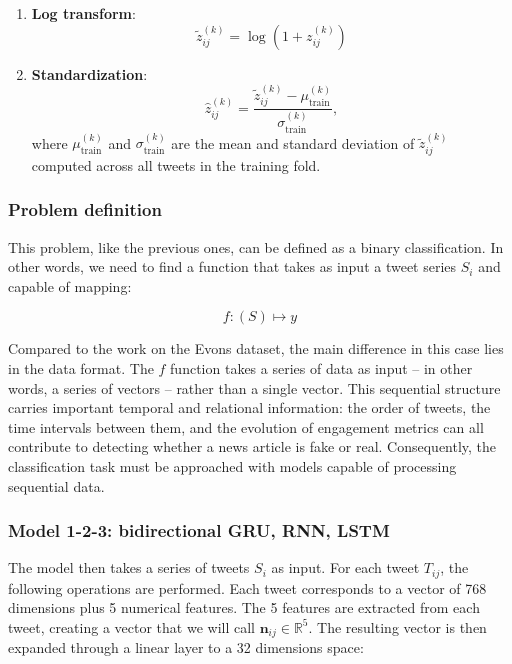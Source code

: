 \documentclass[a4paper,twoside,12pt]{book}
\begin{document}
\begin{enumerate}
	\item \textbf{Log transform}:
	\[
	\tilde{z}_{ij}^{(k)} = \log\left(1 + z_{ij}^{(k)}\right)
	\]
	
	\item \textbf{Standardization}:
	\[
	\hat{z}_{ij}^{(k)} = \frac{\tilde{z}_{ij}^{(k)} - \mu^{(k)}_{\text{train}}}{\sigma^{(k)}_{\text{train}}},
	\]
	where $\mu^{(k)}_{\text{train}}$ and $\sigma^{(k)}_{\text{train}}$ are the mean and standard deviation of $\tilde{z}_{ij}^{(k)}$ computed across all tweets in the training fold.
\end{enumerate}

\subsubsection{Problem definition}
This problem, like the previous ones, can be defined as a binary classification. In other words, we need to find a function that takes as input a tweet series $S_i$ and capable of mapping: 

\[
f: (S) \mapsto y
\]

Compared to the work on the Evons dataset, the main difference in this case lies in the data format. The $f$ function takes a series of data as input -- in other words, a series of vectors -- rather than a single vector. This sequential structure carries important temporal and relational information: the order of tweets, the time intervals between them, and the evolution of engagement metrics can all contribute to detecting whether a news article is fake or real. Consequently, the classification task must be approached with models capable of processing sequential data.

\subsubsection*{Model 1-2-3: bidirectional GRU, RNN, LSTM}

The model then takes a series of tweets $S_i$ as input. For each tweet $T_{ij}$, the following operations are performed. Each tweet corresponds to a vector of 768 dimensions plus 5 numerical features. The 5 features are extracted from each tweet, creating a vector that we will call $\mathbf{n}_{ij} \in \mathbb{R}^5$. The resulting vector is then expanded through a linear layer to a 32 dimensions space: 
\end{document}
